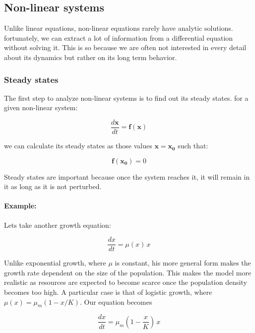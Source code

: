 \documentclass[12pt]{article}
\begin{document}
\subsection{Non-linear systems}

Unlike linear equations, non-linear equations rarely have analytic solutions. fortunately, we can extract a lot of information from a differential equation without solving it. This is so because we are often not interested in every detail about its dynamics but rather on its long term behavior.

\subsubsection{Steady states}

The first step to analyze non-linear systems is to find out its steady states. for a given non-linear system:

\begin{equation}
	\label{odegeneral}
	\frac{d\mathbf{x}}{dt} = \mathbf{f}(\mathbf{x})
\end{equation}

we can calculate its steady states as those values $\mathbf{x}= \mathbf{x_0}$ such that:

\begin{equation}
	\label{stst}
	\mathbf{f}(\mathbf{x_0}) = 0
\end{equation}

Steady states are important because once the system reaches it, it will remain in it as long as it is not perturbed.

\paragraph{Example:} Lets take another growth equation:

\begin{equation}
	\label{odgrowth}
	\frac{dx}{dt} = \mu(x) \, x 
\end{equation}

Unlike exponential growth, where $\mu$ is constant, his more general form makes the growth rate dependent on the size of the population. This makes the model more realistic as resources are expected to become scarce once the population density becomes too high. A particular case is that of logistic growth, where $\mu(x) = \mu_{m} (1 - x / K)$. Our equation becomes

\begin{equation}
	\label{logistic}
	\frac{dx}{dt} = \mu_{m} \left(1 - \frac{x}{K} \right) \, x 
\end{equation}
\end{document}
